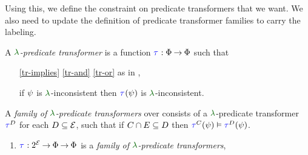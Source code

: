 Using this, we define the constraint on predicate transformers that we want.
We also need to update the definition of predicate transformer families to
carry the labeling.
\begin{definition}
  \label{def:trans'}
  A \emph{$\labeling$-predicate transformer} is a %
  function
  $\aTr{}{}:\Formulae\fun\Formulae$ such that
  \begin{enumerate}[,label=(\textsc{x}\arabic*),ref=\textsc{x}\arabic*]
  \item[\eqref{tr-implies}]
    \eqref{tr-and}\;
    \eqref{tr-or}\; as in ,
  \item[{\labeltext[\textsc{x}4]{(\textsc{x}4)}{tr-false}}] 
    if $\psi$ is $\labeling$-inconsistent then $\aTr{}{\bForm}$ is $\labeling$-inconsistent.
  \end{enumerate}

  \label{def:family'}
  A \emph{family of $\labeling$-predicate transformers} over consists of a
  $\labeling$-predicate transformer $\aTr{\bEvs}{}$ for each
  $D\subseteq\mathcal{E}$, such that if $C \cap E \subseteq D$
  then $\aTr{\cEvs}{\bForm} \rimplies \aTr{\bEvs}{\bForm}$.

  
  \begin{enumerate}[,label=(\textsc{m}\arabic*),ref=\textsc{m}\arabic*]
  \setcounter{enumi}{\value{Btau}}
  \item \label{pom-tau'}
    $\aTr{}{}:2^{\AllEvents}\fun\Formulae \fun\Formulae$ is a \emph{family of $\labeling$-predicate transformers}, 
  \end{enumerate}
\end{definition}

